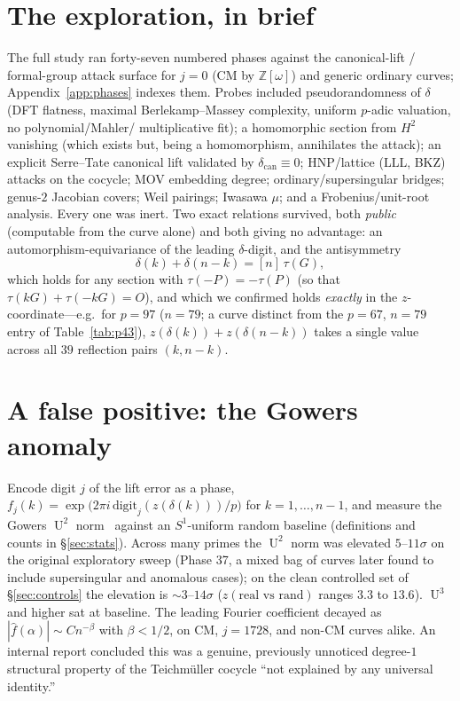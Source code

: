 \documentclass[11pt]{article}
\theoremstyle{definition}
\newcommand{\Z}{\mathbb{Z}}
\DeclareMathOperator{\Uk}{U}
\begin{document}
\section{The exploration, in brief}\label{sec:exploration}

The full study ran forty-seven numbered phases against the canonical-lift /
formal-group attack surface for $j=0$ (CM by $\Z[\omega]$) and generic
ordinary curves; Appendix~\ref{app:phases} indexes them. Probes included
pseudorandomness of $\delta$ (DFT flatness, maximal Berlekamp--Massey
complexity, uniform $p$-adic valuation, no polynomial/Mahler/%
multiplicative fit); a homomorphic section from $H^2$ vanishing (which
exists but, being a homomorphism, annihilates the attack); an explicit
Serre--Tate canonical lift validated by $\delta_{\mathrm{can}}\equiv 0$;
HNP/lattice (LLL, BKZ) attacks on the cocycle; MOV embedding degree;
ordinary/supersingular bridges; genus-$2$ Jacobian covers; Weil pairings;
Iwasawa $\mu$; and a Frobenius/unit-root analysis. Every one was inert.
Two exact relations survived, both \emph{public} (computable from the
curve alone) and both giving no advantage: an automorphism-equivariance
of the leading $\delta$-digit, and the antisymmetry
\begin{equation}\label{eq:antisym}
\delta(k)+\delta(n-k)=[n]\,\tau(G),
\end{equation}
which holds for any section with $\tau(-P)=-\tau(P)$ (so that
$\tau(kG)+\tau(-kG)=O$), and which we confirmed holds \emph{exactly} in
the $z$-coordinate---e.g.\ for $p=97$ ($n=79$; a curve distinct from the
$p=67$, $n=79$ entry of Table~\ref{tab:p43}),
$z(\delta(k))+z(\delta(n-k))$ takes a single value across all $39$
reflection pairs $(k,n-k)$.

\section{A false positive: the Gowers anomaly}\label{sec:falsepos}

Encode digit $j$ of the lift error as a phase,
$f_j(k)=\exp\!\big(2\pi i\,\mathrm{digit}_j(z(\delta(k)))/p\big)$ for
$k=1,\dots,n-1$, and measure the Gowers $\Uk^2$ norm~\cite{taovu} against an
$S^1$-uniform random baseline (definitions and counts in
\S\ref{sec:stats}). Across many primes the $\Uk^2$ norm was elevated
$5$--$11\sigma$ on the original exploratory sweep (Phase 37, a mixed bag
of curves later found to include supersingular and anomalous cases); on
the clean controlled set of \S\ref{sec:controls} the elevation is
$\sim$$3$--$14\sigma$ ($z(\text{real vs rand})$ ranges $3.3$ to $13.6$).
$\Uk^3$ and higher sat at baseline. The leading Fourier
coefficient decayed as $|\hat f(\alpha)|\sim C n^{-\beta}$ with
$\beta<1/2$, on CM, $j{=}1728$, and non-CM curves alike. An internal
report concluded this was a genuine, previously unnoticed degree-$1$
structural property of the Teichm\"uller cocycle ``not explained by any
universal identity.''
\end{document}
